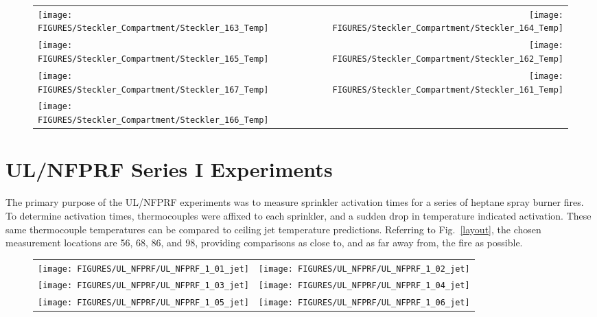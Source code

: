 \begin{figure}[p]
\begin{tabular*}{\textwidth}{l@{\extracolsep{\fill}}r}
\texttt{[image: FIGURES/Steckler\_Compartment/Steckler\_163\_Temp]} &
\texttt{[image: FIGURES/Steckler\_Compartment/Steckler\_164\_Temp]} \\
\texttt{[image: FIGURES/Steckler\_Compartment/Steckler\_165\_Temp]} &
\texttt{[image: FIGURES/Steckler\_Compartment/Steckler\_162\_Temp]} \\
\texttt{[image: FIGURES/Steckler\_Compartment/Steckler\_167\_Temp]} &
\texttt{[image: FIGURES/Steckler\_Compartment/Steckler\_161\_Temp]} \\
\texttt{[image: FIGURES/Steckler\_Compartment/Steckler\_166\_Temp]} &
\end{tabular*}
\label{Steckler_Temp_7}
\end{figure}

\clearpage

\section{UL/NFPRF Series I Experiments}

The primary purpose of the UL/NFPRF experiments was to measure sprinkler activation times for a series of heptane spray burner fires. To determine activation times, thermocouples were affixed to each sprinkler, and a sudden drop in temperature indicated activation. These same thermocouple temperatures can be compared to ceiling jet temperature predictions. Referring to Fig.~\ref{layout}, the chosen measurement locations are 56, 68, 86, and 98, providing comparisons as close to, and as far away from, the fire as possible.


\begin{figure}[h!]
\begin{tabular*}{\textwidth}{l@{\extracolsep{\fill}}r}
\texttt{[image: FIGURES/UL\_NFPRF/UL\_NFPRF\_1\_01\_jet]} &
\texttt{[image: FIGURES/UL\_NFPRF/UL\_NFPRF\_1\_02\_jet]} \\
\texttt{[image: FIGURES/UL\_NFPRF/UL\_NFPRF\_1\_03\_jet]} &
\texttt{[image: FIGURES/UL\_NFPRF/UL\_NFPRF\_1\_04\_jet]} \\
\texttt{[image: FIGURES/UL\_NFPRF/UL\_NFPRF\_1\_05\_jet]} &
\texttt{[image: FIGURES/UL\_NFPRF/UL\_NFPRF\_1\_06\_jet]}
\end{tabular*}
\label{UL_NFPRF_jet_1}
\end{figure}

